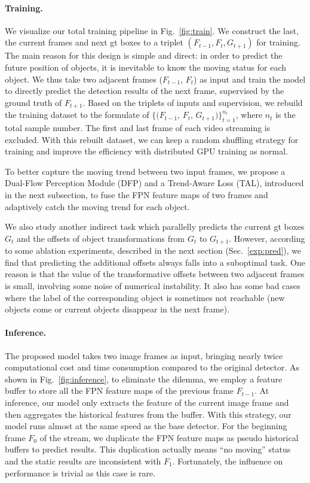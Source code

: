 \documentclass[10pt,twocolumn,letterpaper]{article}
\begin{document}
\paragraph{Training.} We visualize our total training pipeline in Fig.~\ref{fig:train}. We construct the last, the current frames and next gt boxes to a triplet $(F_{t-1}, F_t, G_{t+1})$ for training. The main reason for this design is simple and direct: in order to predict the future position of objects, it is inevitable to know the moving status for each object. We thus take two adjacent frames ($F_{t-1}$, $F_{t}$) as input and train the model to directly predict the detection results of the next frame, supervised by the ground truth of $F_{t+1}$. Based on the triplets of inputs and supervision, we rebuild the training dataset to the formulate of $\{(F_{t-1}$, $F_{t}$, $G_{t+1})\}_{t=1}^{n_{t}}$, where $n_{t}$ is the total sample number. The first and last frame of each video streaming is excluded. With this rebuilt dataset, we can keep a random shuffling strategy for training and improve the efficiency with distributed GPU training as normal.



To better capture the moving trend between two input frames, we propose a Dual-Flow Perception Module (DFP) and a Trend-Aware Loss (TAL), introduced in the next subsection, to fuse the FPN feature maps of two frames and adaptively catch the moving trend for each object.

We also study another indirect task which parallelly predicts the current gt boxes $G_t$ and the offsets of object transformations from $G_t$ to $G_{t+1}$. However, according to some ablation experiments, described in the next section (Sec.~\ref{exp:pred}), we find that predicting the additional offsets always falls into a suboptimal task. One reason is that the value of the transformative offsets between two adjacent frames is small, involving some noise of numerical instability. It also has some bad cases where the label of the corresponding object is sometimes not reachable (new objects come or current objects disappear in the next frame).   

\paragraph{Inference.} The proposed model takes two image frames as input, bringing nearly twice computational cost and time consumption compared to the original detector. As shown in Fig.~\ref{fig:inference}, to eliminate the dilemma, we employ a feature buffer to store all the FPN feature maps of the previous frame $F_{t-1}$. At inference, our model only extracts the feature of the current image frame and then aggregates the historical features from the buffer. With this strategy, our model runs almost at the same speed as the base detector. For the beginning frame $F_0$ of the stream, we duplicate the FPN feature maps as pseudo historical buffers to predict results. This duplication actually means ``no moving'' status and the static results are inconsistent with $F_1$. Fortunately, the influence on performance is trivial as this case is rare.   
\end{document}
